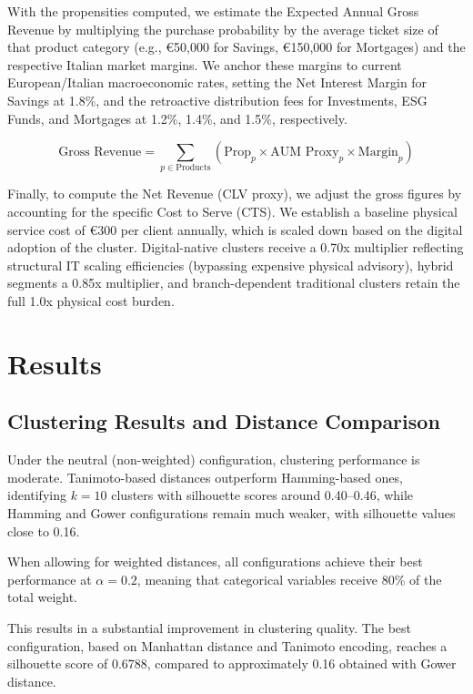 \documentclass[9pt,a4paper,twocolumn,twoside]{rho-class/rho}
\begin{document}
With the propensities computed, we estimate the Expected Annual Gross Revenue by multiplying the purchase probability by the average ticket size of that product category (e.g., €50,000 for Savings, €150,000 for Mortgages) and the respective Italian market margins. We anchor these margins to current European/Italian macroeconomic rates, setting the Net Interest Margin for Savings at 1.8\%, and the retroactive distribution fees for Investments, ESG Funds, and Mortgages at 1.2\%, 1.4\%, and 1.5\%, respectively.

$$ \text{Gross Revenue} = \sum_{p \in \text{Products}} (\text{Prop}_p \times \text{AUM Proxy}_p \times \text{Margin}_p) $$

Finally, to compute the Net Revenue (CLV proxy), we adjust the gross figures by accounting for the specific Cost to Serve (CTS). We establish a baseline physical service cost of €300 per client annually, which is scaled down based on the digital adoption of the cluster. Digital-native clusters receive a 0.70x multiplier reflecting structural IT scaling efficiencies (bypassing expensive physical advisory), hybrid segments a 0.85x multiplier, and branch-dependent traditional clusters retain the full 1.0x physical cost burden.


\section{Results}

\subsection{{Clustering Results and Distance Comparison}}

Under the neutral (non-weighted) configuration, clustering performance is moderate. Tanimoto-based distances outperform Hamming-based ones, identifying $k=10$ clusters with silhouette scores around 0.40–0.46, while Hamming and Gower configurations remain much weaker, with silhouette values close to 0.16.

When allowing for weighted distances, all configurations achieve their best performance at $\alpha = 0.2$, meaning that categorical variables receive 80\% of the total weight.

This results in a substantial improvement in clustering quality. The best configuration, based on Manhattan distance and Tanimoto encoding, reaches a silhouette score of 0.6788, compared to approximately 0.16 obtained with Gower distance.
\end{document}
